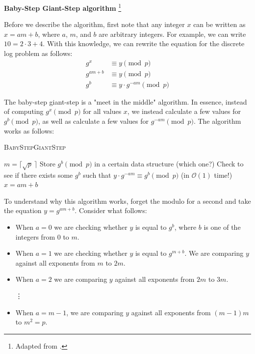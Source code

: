 \documentclass{article}
\begin{document}
    \begin{center}
        \textbf{Baby-Step Giant-Step algorithm}
        \footnote{Adapted from \cite{ec_blog}.}
    \end{center}

    Before we describe the algorithm, first note that any integer $x$ can be written as $x = am + b$, where $a$, $m$, and $b$ are arbitrary integers. For example, we can write $10 = 2 \cdot 3 + 4$. With this knowledge, we can rewrite the equation for the discrete log problem as follows:
    \begin{align*}
        g^{x} &\equiv y \pmod{p} \\
        g^{am + b} &\equiv y\pmod{p} \\
        g^{b} &\equiv y \cdot g^{-am} \pmod{p}
     \end{align*}

     The baby-step giant-step is a "meet in the middle" algorithm. In essence, instead of computing $g^{x} \pmod{p}$ for all values $x$, we instead calculate a few values for $g^{b} \pmod{p}$, as well as calculate a few values for $g^{-am} \pmod{p}$. The algorithm works as follows:

     \begin{algorithm}
        \caption{\textsc{BabyStepGiantStep}}
        \label{alg:bsgs}
        \begin{algorithmic}
            \State $m = \lceil \sqrt{p}\ \rceil$
                \State Store $g^{b} \pmod{p}$ in a certain data structure (which one?)
            \EndFor
                \State Check to see if there exists some $g^{b}$ such that $y \cdot g^{-am} \equiv g^{b} \pmod{p}$ (in $\mathcal{O}(1)$ time!)
            \EndFor
            \State \Return $x = am + b$
        \end{algorithmic}
    \end{algorithm}
    To understand why this algorithm works, forget the modulo for a second and take the equation $y = g^{am + b}$. Consider what follows:
    \begin{itemize}
        \item When $a = 0$ we are checking whether $y$ is equal to $g^{b}$, where $b$ is one of the integers from $0$ to $m$.
        \item When $a = 1$ we are checking whether $y$ is equal to $g^{m + b}$. We are comparing $y$ against all exponents from $m$ to $2m$.
        \item When $a = 2$ we are comparing $y$ against all exponents from $2m$ to $3m$.
        \item[\vdots]
        \item When $a = m - 1$, we are comparing $y$ against all exponents from $(m - 1)m$ to $m^{2} = p$.
    \end{itemize}
\end{document}
